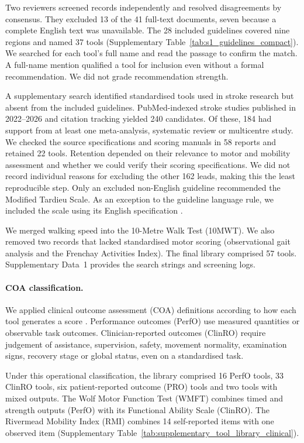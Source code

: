 \documentclass[11pt]{article}
\begin{document}
Two reviewers screened records independently and resolved disagreements by consensus. They excluded 13 of the 41 full-text documents, seven because a complete English text was unavailable. The 28 included guidelines covered nine regions and named 37 tools (Supplementary Table~\ref{tab:s1_guidelines_compact}). We searched for each tool's full name and read the passage to confirm the match. A full-name mention qualified a tool for inclusion even without a formal recommendation. We did not grade recommendation strength.

A supplementary search identified standardised tools used in stroke research but absent from the included guidelines. PubMed-indexed stroke studies published in 2022--2026 and citation tracking yielded 240 candidates. Of these, 184 had support from at least one meta-analysis, systematic review or multicentre study. We checked the source specifications and scoring manuals in 58 reports and retained 22 tools. Retention depended on their relevance to motor and mobility assessment and whether we could verify their scoring specifications. We did not record individual reasons for excluding the other 162 leads, making this the least reproducible step. Only an excluded non-English guideline recommended the Modified Tardieu Scale. As an exception to the guideline language rule, we included the scale using its English specification \cite{S2RehabMeasuresModifiedTardieu}.

We merged walking speed into the 10-Metre Walk Test (10MWT). We also removed two records that lacked standardised motor scoring (observational gait analysis and the Frenchay Activities Index). The final library comprised 57 tools. Supplementary Data~1 provides the search strings and screening logs.

\paragraph{COA classification.} We applied clinical outcome assessment (COA) definitions according to how each tool generates a score \cite{FDANIH2016BESTCOA,Walton2015COAConceptualFoundation}. Performance outcomes (PerfO) use measured quantities or observable task outcomes. Clinician-reported outcomes (ClinRO) require judgement of assistance, supervision, safety, movement normality, examination signs, recovery stage or global status, even on a standardised task.

Under this operational classification, the library comprised 16 PerfO tools, 33 ClinRO tools, six patient-reported outcome (PRO) tools and two tools with mixed outputs. The Wolf Motor Function Test (WMFT) combines timed and strength outputs (PerfO) with its Functional Ability Scale (ClinRO). The Rivermead Mobility Index (RMI) combines 14 self-reported items with one observed item (Supplementary Table~\ref{tab:supplementary_tool_library_clinical}).
\end{document}
